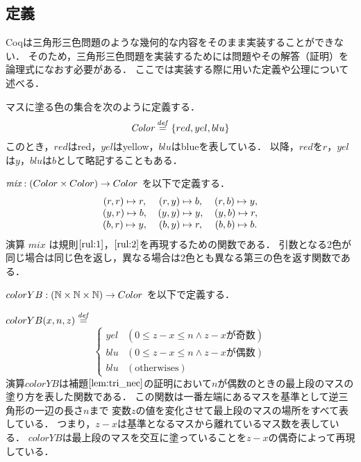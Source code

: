 \subsection{定義}
Coqは三角形三色問題のような幾何的な内容をそのまま実装することができない．
そのため，三角形三色問題を実装するためには問題やその解答（証明）を論理式になおす必要がある．
ここでは実装する際に用いた定義や公理について述べる．
\begin{dfn}[$Color$]
  マスに塗る色の集合を次のように定義する．
  \[
  \textit{Color} \overset{{\it def}}{=} \{red, yel, blu\}
  \]
  このとき，$red$はred，$yel$はyellow，$blu$はblueを表している．
  以降，$red$を$r$，$yel$は$y$，$blu$は$b$として略記することもある．
\end{dfn}
\begin{dfn}[$mix$]
  $\textit{mix} : (Color \times Color ) \to Color$ を以下で定義する．
  \[
  \begin{tabular}{ccccc}
    $(r,r) \Pto r,$ & $(r,y) \Pto b,$ & $(r,b) \Pto y,$ \\
    $(y,r) \Pto b,$ & $(y,y) \Pto y,$ & $(y,b) \Pto r,$ \\
    $(b,r) \Pto y,$ & $(b,y) \Pto r,$ & $(b,b) \Pto b.$ \\
  \end{tabular}
  \]
  演算 $mix$ は規則$\ref{rul:1}$，$\ref{rul:2}$を再現するための関数である．
引数となる$2$色が同じ場合は同じ色を返し，異なる場合は$2$色とも異なる第三の色を返す関数である．
\end{dfn}
\begin{dfn}[$colorYB$]
  $colorYB : (\mathbb{N} \times \mathbb{N} \times \mathbb{N}) \to Color$ を以下で定義する．

  $colorYB(x,n,z) \overset{{\it def}}{=}$
  \[
  \begin{cases}
    yel & (0 \leq z-x \leq n \land z-x\text{が奇数}) \\
    blu & (0 \leq z-x \leq n \land z-x\text{が偶数}) \\
    blu & (\text{otherwises})
  \end{cases}
  \]
  演算$colorYB$は補題$\ref{lem:tri_nec}$の証明において$n$が偶数のときの最上段のマスの塗り方を表した関数である．
  この関数は一番左端にあるマスを基準として逆三角形の一辺の長さ$n$まで
  変数$z$の値を変化させて最上段のマスの場所をすべて表している．
  つまり，$z-x$は基準となるマスから離れているマス数を表している．
  $colorYB$は最上段のマスを交互に塗っていることを$z-x$の偶奇によって再現している．
\end{dfn}
